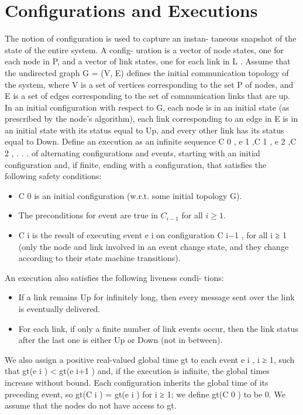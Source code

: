 \section{Configurations and Executions}
The notion of configuration is used to capture an instan-
taneous snapshot of the state of the entire system. A config-
uration is a vector of node states, one for each node in P,
and a vector of link states, one for each link in L .
Assume that the undirected graph G = (V, E) defines the
initial communication topology of the system, where V is a
set of vertices corresponding to the set P of nodes, and E
is a set of edges corresponding to the set of communication
links that are up. In an initial configuration with respect
to G, each node is in an initial state (as prescribed by the
node’s algorithm), each link corresponding to an edge in E
is in an initial state with its status equal to Up, and every
other link has its status equal to Down.
Define an execution as an infinite sequence
C 0 , e 1 ,C 1 , e 2 ,C 2 , . . . of alternating configurations and
events, starting with an initial configuration and, if finite,
ending with a configuration, that satisfies the following
safety conditions:
\begin{itemize}
\item C 0 is an initial configuration (w.r.t. some initial topology G).
\item The preconditions for event are true in $C_{i-1}$ for all $i\geq 1$.
\item C i is the result of executing event e i on configuration C i−1 , for all i ≥ 1 (only the node and link involved in an event change state, and they change according to their state machine transitions).
\end{itemize}

An execution also satisfies the following liveness condi-
tions:
\begin{itemize}
\item If a link remains Up for infinitely long, then every message sent over the link is eventually delivered.
\item For each link, if only a finite number of link events occur, then the link status after the last one is either Up or Down (not in between).
\end{itemize}

We also assign a positive real-valued global time gt to each event e i , i ≥ 1, such that gt(e i ) < gt(e i+1 ) and, if the execution is infinite, the global times increase without bound. Each configuration inherits the global time of its preceding event, so gt(C i ) = gt(e i ) for i ≥ 1; we define gt(C 0 ) to be 0. We assume that the nodes do not have access to gt.
